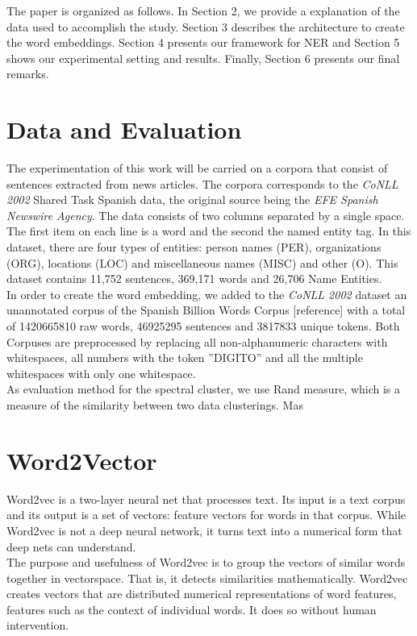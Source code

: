 \documentclass[]{article}
\begin{document}
The paper is organized as follows. In Section 2, we provide a explanation of the data used to accomplish the study. Section 3 describes the architecture to create the word embeddings. Section 4 presents our framework for NER and Section 5 shows our experimental setting and results. Finally, Section 6 presents our final remarks.

\section{Data and Evaluation}
  The experimentation of this work will be carried on a corpora that consist of sentences extracted from news articles. The corpora corresponds to the \emph{CoNLL 2002} Shared Task Spanish data, the original source being the \emph{EFE Spanish Newswire Agency}.  The data consists of two columns separated by a single space. The first item on each line is a word and the second the named entity tag. In this dataset, there are four types of entities: person names (PER), organizations (ORG), locations (LOC) and miscellaneous names (MISC) and other (O). This dataset contains 11,752 sentences, 369,171 words and 26,706 Name Entities.  \\
 
  In order to create the word embedding, we added to the \emph{CoNLL 2002} dataset an unannotated corpus of the Spanish Billion Words Corpus [reference] with a total of 1420665810 raw words,  46925295 sentences and 3817833 unique tokens. Both Corpuses are preprocessed by replacing all non-alphanumeric characters with whitespaces, all numbers with the token ''DIGITO'' and all the multiple whitespaces with only one whitespace. \\

As evaluation method for the spectral cluster, we use Rand measure, which is a measure of the similarity between two data clusterings. Mas 




\section{Word2Vector}

Word2vec is a two-layer neural net that processes text. Its input is a text corpus and its output is a set of vectors: feature vectors for words in that corpus. While Word2vec is not a deep neural network, it turns text into a numerical form that deep nets can understand. \\ 

The purpose and usefulness of Word2vec is to group the vectors of similar words together in vectorspace. That is, it detects similarities mathematically. Word2vec creates vectors that are distributed numerical representations of word features, features such as the context of individual words. It does so without human intervention. \\
\end{document}

